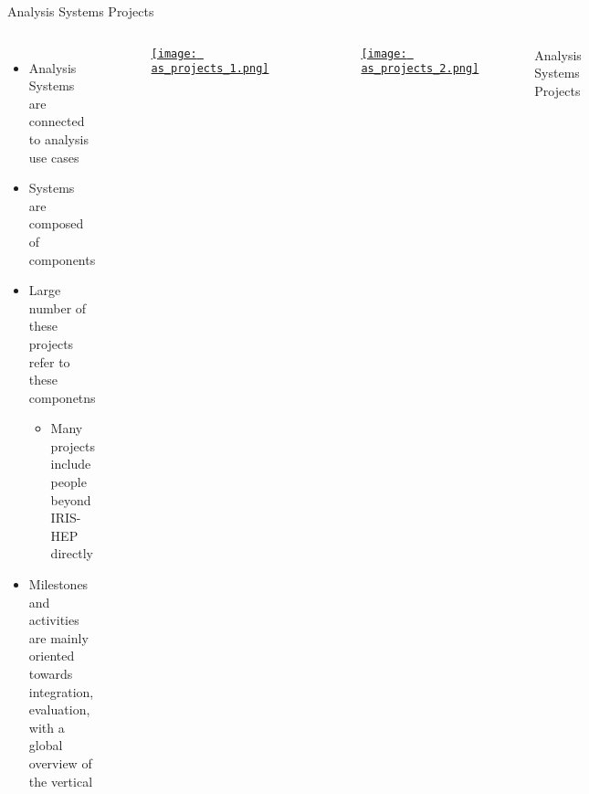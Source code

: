 \begin{frame}{Analysis Systems Projects}
  \begin{columns}
    \begin{itemize}\setlength{\itemsep}{0.25 cm}
      \item Analysis Systems are connected to analysis use cases
      \item Systems are composed of components
      \item Large number of these projects refer to these componetns
      \begin{itemize}
        \item Many projects include people beyond IRIS-HEP directly
      \end{itemize}
      \item Milestones and activities are mainly oriented towards integration, evaluation, with a global overview of the vertical
    \end{itemize}
%
    \begin{columns}
      \begin{column}{0.5\textwidth}
        \begin{figure}
          \begin{center}
            \href{https://iris-hep.org/as.html}{\texttt{[image: as\_projects\_1.png]}}
          \end{center}
        \end{figure}
      \end{column}
      \begin{column}{0.5\textwidth}
        \begin{figure}
          \begin{center}
            \href{https://iris-hep.org/as.html}{\texttt{[image: as\_projects\_2.png]}}
          \end{center}
        \end{figure}
      \end{column}
    \end{columns}
    \begin{center}
      Analysis Systems Projects
    \end{center}
  \end{columns}
\end{frame}

